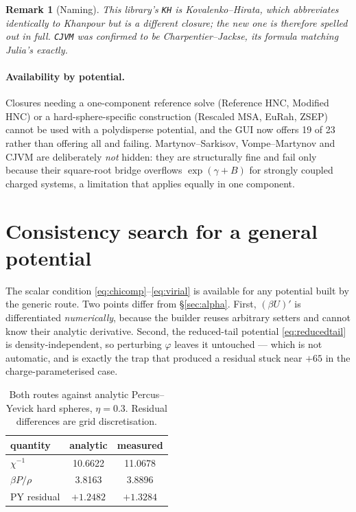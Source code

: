 \documentclass[11pt,a4paper]{article}
\newcommand{\code}[1]{\texttt{\hspace{0pt}#1}}
\newtheorem{remark}{Remark}
\begin{document}
\begin{remark}[Naming]
This library's \code{KH} is Kovalenko--Hirata, which abbreviates identically
to Khanpour but is a different closure; the new one is therefore spelled out
in full. \code{CJVM} was confirmed to be Charpentier--Jackse, its formula
matching Julia's exactly.
\end{remark}

\paragraph{Availability by potential.} Closures needing a one-component
reference solve (Reference HNC, Modified HNC) or a hard-sphere-specific
construction (Rescaled MSA, EuRah, ZSEP) cannot be used with a polydisperse
potential, and the GUI now offers 19 of 23 rather than offering all and
failing. Martynov--Sarkisov, Vompe--Martynov and CJVM are deliberately
\emph{not} hidden: they are structurally fine and fail only because their
square-root bridge overflows $\exp(\gamma+B)$ for strongly coupled charged
systems, a limitation that applies equally in one component.

\section{Consistency search for a general potential}
\label{sec:genericalpha}

The scalar condition \eqref{eq:chicomp}--\eqref{eq:virial} is available for
any potential built by the generic route. Two points differ from
\S\ref{sec:alpha}. First, $(\beta U)'$ is differentiated \emph{numerically},
because the builder reuses arbitrary setters and cannot know their analytic
derivative. Second, the reduced-tail potential \eqref{eq:reducedtail} is
density-independent, so perturbing $\varphi$ leaves it untouched --- which is
not automatic, and is exactly the trap that produced a residual stuck near
$+65$ in the charge-parameterised case.

\begin{table}[htbp]
\centering
\caption{Both routes against analytic Percus--Yevick hard spheres,
$\eta=0.3$. Residual differences are grid discretisation.}
\begin{tabular}{lcc}
\toprule
quantity & analytic & measured\\
\midrule
$\chi^{-1}$      & 10.6622 & 11.0678\\
$\beta P/\rho$   & 3.8163  & 3.8896\\
PY residual      & $+1.2482$ & $+1.3284$\\
\bottomrule
\end{tabular}
\end{table}
\end{document}
